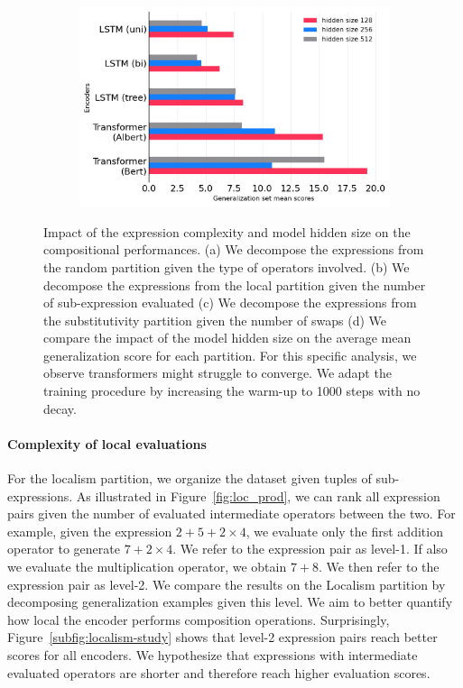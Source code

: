 \begin{figure}[htb!]
\begin{subfigure}[b]{7.52cm}
        \caption{}
        \label{subfig:substitutivity-study}
    \end{subfigure}
    \hfill
    \begin{subfigure}[b]{7.52cm}  
        \centering 
        \includegraphics[width=\columnwidth]{images/hidden-size-study_v2.png}
        \caption{}
        \label{subfig:hidden-size}
    \end{subfigure}
    \caption{Impact of the expression complexity and model hidden size on the compositional performances. (a) We decompose the expressions from the random partition given the type of operators involved. (b) We decompose the expressions from the local partition given the number of sub-expression evaluated (c) We decompose the expressions from the substitutivity partition given the number of swaps (d) We compare the impact of the model hidden size on the average mean generalization score for each partition. For this specific analysis, we observe transformers might struggle to converge. We adapt the training procedure by increasing the warm-up to 1000 steps with no decay.}
\end{figure}

\paragraph{Complexity of local evaluations} For the localism partition, we organize the dataset given tuples of sub-expressions. As illustrated in Figure~\ref{fig:loc_prod}, we can rank all expression pairs given the number of evaluated intermediate operators between the two. For example, given the expression $2 + 5 + 2 \times 4$, we evaluate only the first addition operator to generate $7 + 2 \times 4$. We refer to the expression pair as level-1. If also we evaluate the multiplication operator, we obtain $7 + 8$. We then refer to the expression pair as level-2. We compare the results on the Localism partition by decomposing generalization examples given this level. We aim to better quantify how local the encoder performs composition operations. Surprisingly, Figure~\ref{subfig:localism-study} shows that level-2 expression pairs reach better scores for all encoders. We hypothesize that expressions with intermediate evaluated operators are shorter and therefore reach higher evaluation scores.


